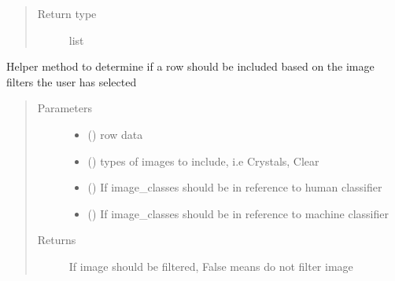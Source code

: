 \documentclass[letterpaper,10pt,english]{sphinxmanual}
\begin{document}
\begin{fulllineitems}
\begin{fulllineitems}
\begin{quote}
\begin{description}
\item[{Return type}] \leavevmode
list

\end{description}\end{quote}

\end{fulllineitems}


\begin{fulllineitems}
\label{\detokenize{polo.widgets:polo.widgets.table_viewer.TableViewer.filter}}
Helper method to determine if a row should be included based on
the image filters the user has selected
\begin{quote}\begin{description}
\item[{Parameters}] \leavevmode\begin{itemize}
\item {} 
 () \textendash{} row data

\item {} 
 () \textendash{} types of images to include, i.e Crystals, Clear

\item {} 
 () \textendash{} If image\_classes should be in reference to human classifier

\item {} 
 () \textendash{} If image\_classes should be in reference to machine classifier

\end{itemize}

\item[{Returns}] \leavevmode
If image should be filtered, False means do not filter image


\end{description}
\end{quote}
\end{fulllineitems}
\end{fulllineitems}
\end{document}
